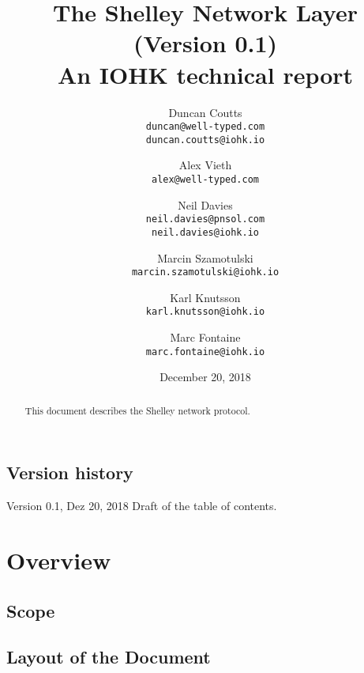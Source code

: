 \documentclass{report}
\theoremstyle{definition}{
  \newtheorem{lemma}{Lemma}[section] %
  \newtheorem{definition}[lemma]{Definition}
}
\theoremstyle{theorem}{
  \newtheorem{invariant}[lemma]{Invariant}
  \newtheorem{proofobligation}[lemma]{Proof Obligation}
}
\numberwithin{equation}{lemma}
\begin{document}
\title{The Shelley Network Layer\\
       {\small (Version 0.1)} \\
       {\large \sc An IOHK technical report}}
\author{Duncan Coutts \\ {\small \texttt{duncan@well-typed.com}} \\
                         {\small \texttt{duncan.coutts@iohk.io}}
   \and Alex Vieth \\ {\small \texttt{alex@well-typed.com}}
   \and Neil Davies \\ {\small \texttt{neil.davies@pnsol.com}} \\
                       {\small \texttt{neil.davies@iohk.io}}
   \and Marcin Szamotulski \\ {\small \texttt{marcin.szamotulski@iohk.io}}
   \and Karl Knutsson \\ {\small \texttt{karl.knutsson@iohk.io}}
   \and Marc Fontaine \\ {\small \texttt{marc.fontaine@iohk.io}}
   }
\date{December 20, 2018}

\maketitle

\begin{abstract}
  This document describes the Shelley network protocol.
\end{abstract}

\tableofcontents

\section*{Version history}

\begin{description}
\item[Version 0.1, Dez 20, 2018  Draft of the table of contents.]
                                  
\end{description}

\chapter{Overview}
\section{Scope}
\section{Layout of the Document}
\end{document}
